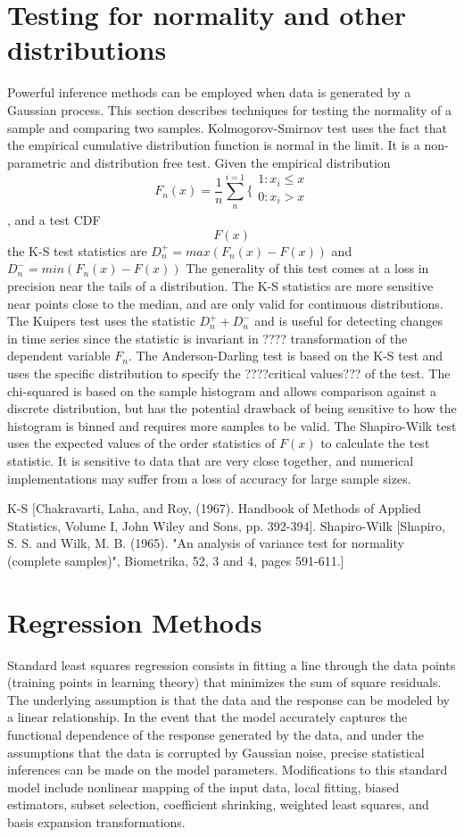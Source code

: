 \section*{Testing for normality and other distributions } Powerful inference methods can be employed when data is generated by a Gaussian process. This section describes techniques for testing the normality of a sample and comparing two samples.  Kolmogorov-Smirnov test uses the fact that the empirical cumulative distribution function is normal in the limit. It is a non-parametric and distribution free test. Given the empirical distribution
 \[F_n(x) = \frac{1}{n} \sum\limits_{n}^{i=1} \biggl\{\begin{array}{c}1 :x_i\leq x \\0 : x_i>x\\ \end{array}\]
 , and a test CDF\[ F(x)\] the K-S test statistics are $D_n^+ = max(F_n(x)-F(x) ) $ and $D_n^- = min(F_n(x)-F(x) )$ The generality of this test comes at a loss in precision near the tails of a distribution.  The K-S statistics are more sensitive near points close to the median, and are only valid for continuous distributions.  The Kuipers test uses the statistic $D_n^+ + D_n^- $ and is useful for detecting changes in time series since the statistic is invariant in ???? transformation of the dependent variable $ F_n$.  The Anderson-Darling test is based on the K-S test and uses the specific distribution to specify the ????critical values??? of the test.  The chi-squared is based on the sample histogram and allows comparison against a discrete distribution, but has the potential drawback of being sensitive to how the histogram is binned and requires more samples to be valid.  The Shapiro-Wilk test uses the expected values of the order statistics of $F(x)$ to calculate the test statistic.  It is sensitive to data that are very close together, and numerical implementations may suffer from a loss of accuracy for large sample sizes.

 K-S [Chakravarti, Laha, and Roy, (1967). Handbook of Methods of Applied Statistics, Volume I, John Wiley and Sons, pp. 392-394].  Shapiro-Wilk [Shapiro, S. S. and Wilk, M. B. (1965). "An analysis of variance test for normality (complete samples)", Biometrika, 52, 3 and 4, pages 591-611.]


\section*{Regression Methods}Standard least squares regression consists in fitting a line through the data points (training points in learning theory) that minimizes the sum of square residuals.  The underlying assumption is that the data and the response can be modeled by a linear relationship.  In the event that the model accurately captures the functional dependence of the response generated by the data, and under the assumptions that the data is corrupted by Gaussian noise, precise statistical inferences can be made on the model parameters.  Modifications to this standard model include nonlinear mapping of the input data, local fitting, biased estimators, subset selection, coefficient shrinking, weighted least squares, and basis expansion transformations.

